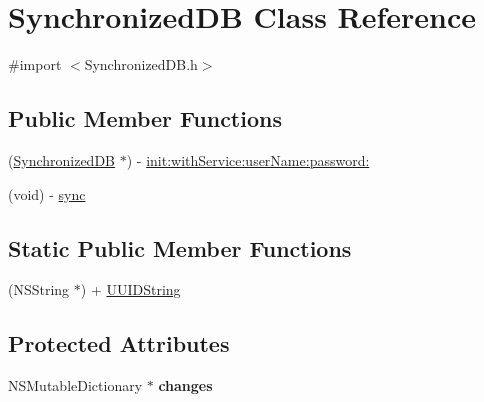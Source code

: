 \hypertarget{interface_synchronized_d_b}{
\section{SynchronizedDB Class Reference}
\label{interface_synchronized_d_b}
}


{\ttfamily \#import $<$SynchronizedDB.h$>$}

\subsection*{Public Member Functions}
\begin{DoxyCompactItemize}
\item 
(\hyperlink{interface_synchronized_d_b}{SynchronizedDB} $\ast$) -\/ \hyperlink{interface_synchronized_d_b_a51f252c9f196de4d1e21d63c60a4a3f1}{init:withService:userName:password:}
\item 
(void) -\/ \hyperlink{interface_synchronized_d_b_a912d2389ea3dfd15dc50f06504dbad96}{sync}
\end{DoxyCompactItemize}
\subsection*{Static Public Member Functions}
\begin{DoxyCompactItemize}
\item 
(NSString $\ast$) + \hyperlink{interface_synchronized_d_b_adacebfe53dfb03c79d261c575a91e4ab}{UUIDString}
\end{DoxyCompactItemize}
\subsection*{Protected Attributes}
\begin{DoxyCompactItemize}
\item 
\hypertarget{interface_synchronized_d_b_ae64b8317169111a9a0066f156f81ee9a}{
NSMutableDictionary $\ast$ {\bfseries changes}}
\label{interface_synchronized_d_b_ae64b8317169111a9a0066f156f81ee9a}

\end{DoxyCompactItemize}
